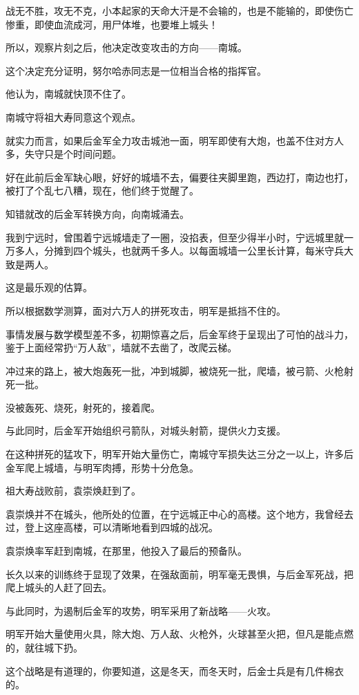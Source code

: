 \begin{multicols}{\theparacolNo}
战无不胜，攻无不克，小本起家的天命大汗是不会输的，也是不能输的，即使伤亡惨重，即使血流成河，用尸体堆，也要堆上城头！

所以，观察片刻之后，他决定改变攻击的方向——南城。

这个决定充分证明，努尔哈赤同志是一位相当合格的指挥官。

他认为，南城就快顶不住了。

南城守将祖大寿同意这个观点。

就实力而言，如果后金军全力攻击城池一面，明军即使有大炮，也盖不住对方人多，失守只是个时间问题。

好在此前后金军缺心眼，好好的城墙不去，偏要往夹脚里跑，西边打，南边也打，被打了个乱七八糟，现在，他们终于觉醒了。

知错就改的后金军转换方向，向南城涌去。

我到宁远时，曾围着宁远城墙走了一圈，没掐表，但至少得半小时，宁远城里就一万多人，分摊到四个城头，也就两千多人。以每面城墙一公里长计算，每米守兵大致是两人。

这是最乐观的估算。

所以根据数学测算，面对六万人的拼死攻击，明军是抵挡不住的。

事情发展与数学模型差不多，初期惊喜之后，后金军终于呈现出了可怕的战斗力，鉴于上面经常扔“万人敌”，墙就不去凿了，改爬云梯。

冲过来的路上，被大炮轰死一批，冲到城脚，被烧死一批，爬墙，被弓箭、火枪射死一批。

没被轰死、烧死，射死的，接着爬。

与此同时，后金军开始组织弓箭队，对城头射箭，提供火力支援。

在这种拼死的猛攻下，明军开始大量伤亡，南城守军损失达三分之一以上，许多后金军爬上城墙，与明军肉搏，形势十分危急。

祖大寿战败前，袁崇焕赶到了。

袁崇焕并不在城头，他所处的位置，在宁远城正中心的高楼。这个地方，我曾经去过，登上这座高楼，可以清晰地看到四城的战况。

袁崇焕率军赶到南城，在那里，他投入了最后的预备队。

长久以来的训练终于显现了效果，在强敌面前，明军毫无畏惧，与后金军死战，把爬上城头的人赶了回去。

与此同时，为遏制后金军的攻势，明军采用了新战略——火攻。

明军开始大量使用火具，除大炮、万人敌、火枪外，火球甚至火把，但凡是能点燃的，就往城下扔。

这个战略是有道理的，你要知道，这是冬天，而冬天时，后金士兵是有几件棉衣的。


\end{multicols}
